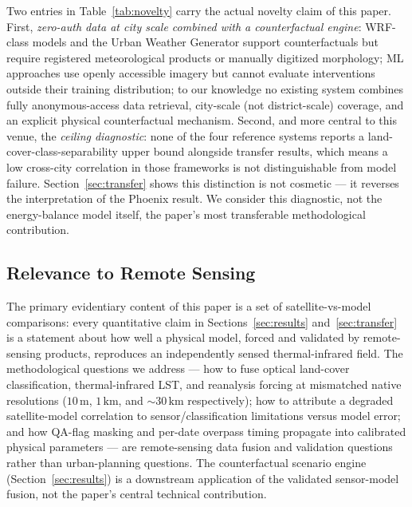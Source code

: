 \documentclass[12pt, letterpaper]{article}
\begin{document}
Two entries in Table~\ref{tab:novelty} carry the actual novelty claim of this
paper. First, \emph{zero-auth data at city scale combined with a
counterfactual engine}: WRF-class models and the Urban Weather Generator
support counterfactuals but require registered meteorological products or
manually digitized morphology; ML approaches use openly accessible imagery
but cannot evaluate interventions outside their training distribution; to
our knowledge no existing system combines fully anonymous-access data
retrieval, city-scale (not district-scale) coverage, and an explicit physical
counterfactual mechanism. Second, and more central to this venue, the
\emph{ceiling diagnostic}: none of the four reference systems reports a
land-cover-class-separability upper bound alongside transfer results, which
means a low cross-city correlation in those frameworks is not distinguishable
from model failure. Section~\ref{sec:transfer} shows this distinction is not
cosmetic — it reverses the interpretation of the Phoenix result. We consider
this diagnostic, not the energy-balance model itself, the paper's most
transferable methodological contribution.

\subsection{Relevance to Remote Sensing}
\label{sec:rs_relevance}

The primary evidentiary content of this paper is a set of satellite-vs-model
comparisons: every quantitative claim in Sections~\ref{sec:results}
and~\ref{sec:transfer} is a statement about how well a physical model,
forced and validated by remote-sensing products, reproduces an independently
sensed thermal-infrared field. The methodological questions we address —
how to fuse optical land-cover classification, thermal-infrared LST, and
reanalysis forcing at mismatched native resolutions ($10\,\text{m}$,
$1\,\text{km}$, and $\sim$$30\,\text{km}$ respectively); how to attribute a
degraded satellite-model correlation to sensor/classification limitations
versus model error; and how QA-flag masking and per-date overpass timing
propagate into calibrated physical parameters — are remote-sensing data
fusion and validation questions rather than urban-planning questions. The
counterfactual scenario engine (Section~\ref{sec:results}) is a downstream
application of the validated sensor-model fusion, not the paper's central
technical contribution.

\end{document}
